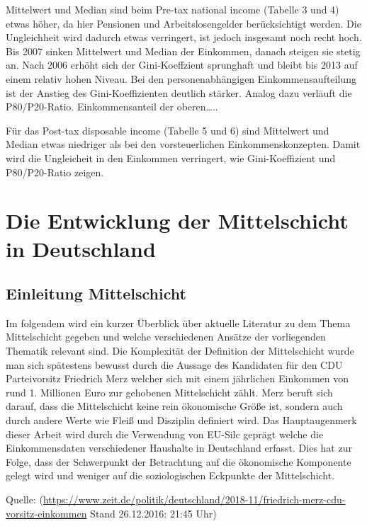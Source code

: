 \documentclass[12pt,]{article}
\begin{document}
Mittelwert und Median sind beim Pre-tax national income (Tabelle 3 und
4) etwas höher, da hier Pensionen und Arbeitslosengelder berücksichtigt
werden. Die Ungleichheit wird dadurch etwas verringert, ist jedoch
insgesamt noch recht hoch. Bis 2007 sinken Mittelwert und Median der
Einkommen, danach steigen sie stetig an. Nach 2006 erhöht sich der
Gini-Koeffzient sprunghaft und bleibt bis 2013 auf einem relativ hohen
Niveau. Bei den personenabhängigen Einkommensaufteilung ist der Anstieg
des Gini-Koeffizienten deutlich stärker. Analog dazu verläuft die
P80/P20-Ratio. Einkommensanteil der oberen\ldots{}..

Für das Post-tax disposable income (Tabelle 5 und 6) sind Mittelwert und
Median etwas niedriger als bei den vorsteuerlichen Einkommenskonzepten.
Damit wird die Ungleicheit in den Einkommen verringert, wie
Gini-Koeffizient und P80/P20-Ratio zeigen.

\section{Die Entwicklung der Mittelschicht in
Deutschland}\label{die-entwicklung-der-mittelschicht-in-deutschland}

\subsection{Einleitung Mittelschicht}\label{einleitung-mittelschicht}

Im folgendem wird ein kurzer Überblick über aktuelle Literatur zu dem
Thema Mittelschicht gegeben und welche verschiedenen Ansätze der
vorliegenden Thematik relevant sind. Die Komplexität der Definition der
Mittelschicht wurde man sich spätestens bewusst durch die Aussage des
Kandidaten für den CDU Parteivorsitz Friedrich Merz welcher sich mit
einem jährlichen Einkommen von rund 1. Millionen Euro zur gehobenen
Mittelschicht zählt. Merz beruft sich darauf, dass die Mittelschicht
keine rein ökonomische Größe ist, sondern auch durch andere Werte wie
Fleiß und Disziplin definiert wird. Das Hauptaugenmerk dieser Arbeit
wird durch die Verwendung von EU-Silc geprägt welche die Einkommensdaten
verschiedener Haushalte in Deutschland erfasst. Dies hat zur Folge, dass
der Schwerpunkt der Betrachtung auf die ökonomische Komponente gelegt
wird und weniger auf die soziologischen Eckpunkte der Mittelschicht.

Quelle:
(\url{https://www.zeit.de/politik/deutschland/2018-11/friedrich-merz-cdu-vorsitz-einkommen}
Stand 26.12.2016: 21:45 Uhr)
\end{document}
